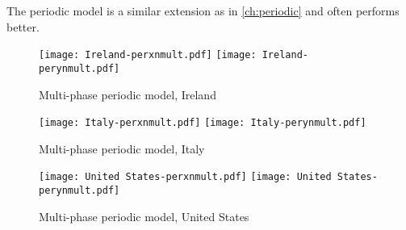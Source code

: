 The periodic model is a similar extension as in \ref{ch:periodic} and often performs better.

\begin{figure}[H]
  \texttt{[image: Ireland-perxnmult.pdf]} \label{fig:ireland-perxnmult}
\endminipage\hfill
{}
  \texttt{[image: Ireland-perynmult.pdf]} \label{fig:ireland-perynmult}
\endminipage
\caption{Multi-phase periodic model, Ireland}
\end{figure}

\begin{figure}[H]
  \texttt{[image: Italy-perxnmult.pdf]} \label{fig:italy-perxnmult}
\endminipage\hfill
{}
  \texttt{[image: Italy-perynmult.pdf]} \label{fig:italy-perynmult}
\endminipage
\caption{Multi-phase periodic model, Italy}
\end{figure}

\begin{figure}[H]
  \texttt{[image: United States-perxnmult.pdf]} \label{fig:usa-perxnmult}
\endminipage\hfill
{}
  \texttt{[image: United States-perynmult.pdf]} \label{fig:usa-perynmult}
\endminipage
\caption{Multi-phase periodic model, United States}
\end{figure}
